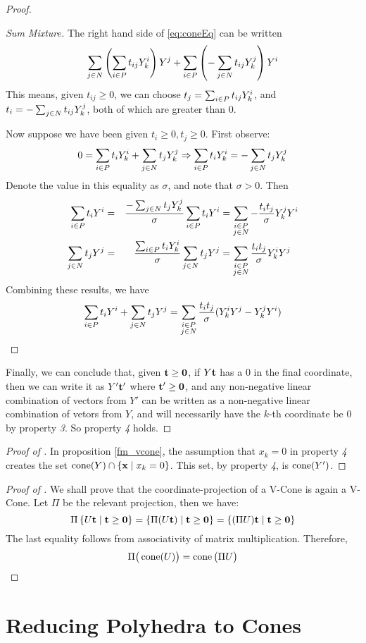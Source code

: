 \begin{proof}
\begin{proof}[Sum Mixture]
		The right hand side of \eqref{eq:coneEq} can be written
		\[ \sum_{j\in N} \left(\sum_{i\in P} t_{ij}Y^i_{k}\right) Y^j +
			\sum_{i\in P} \left(-\sum_{j\in N} t_{ij}Y^j_{k}\right) Y^i \]
		This means, given $t_{ij} \geq 0$, we can choose $t_j = \sum_{i\in P} t_{ij}Y^i_{k}$, and $t_i = -\sum_{j\in N} t_{ij}Y^j_{k}$, both of which are greater than $0$.

		Now suppose we have been given $t_i \geq 0, t_j \geq 0$.  First observe:
		\[ 0 = \sum_{i\in P} t_iY^i_{k} + \sum_{j\in N} t_jY^j_{k} \Rightarrow \sum_{i\in P} t_iY^i_{k} = -\sum_{j\in N} t_jY^j_{k}\]
		Denote the value in this equality as $\sigma$, and note that $\sigma > 0$.  Then
		\begin{alignat*}{3}
			\sum_{i\in P} t_i Y^i & = & \frac{-\sum_{j\in N} t_j Y^j_{k}}{\sigma}\sum_{i\in P} t_i Y^i & =
			\sum_{\substack{i\in P \\ j\in N}} -\frac{t_i t_j}{\sigma}Y^j_{k} Y^i                              \\
			\sum_{j\in N} t_j Y^j & = & \frac{\sum_{i\in P} t_i Y^i_{k}}{\sigma}\sum_{j\in N} t_j Y^j  & =
			\sum_{\substack{i\in P \\ j\in N}} \frac{t_i t_j}{\sigma}Y^i_{k} Y^j
		\end{alignat*}
		Combining these results, we have
		\[ \sum_{i\in P} t_i Y^i + \sum_{j\in N} t_j Y^j = \sum_{\substack{i\in P \\ j\in N}} \frac{t_i t_j}{\sigma}(Y^i_{k} Y^j - Y^j_{k} Y^i) \]
	\end{proof}
	Finally, we can conclude that, given $\mathbf{t} \geq \mathbf{0}$, if $Y\mathbf{t}$ has a $0$ in the final coordinate, then we can write it as $ Y'\mathbf{t}'$ where $\mathbf{t}' \geq \mathbf{0}$, and any non-negative linear combination of vectors from $Y'$ can be written as a non-negative linear combination of vetors from $Y$, and will necessarily have the $k$-th coordinate be $0$ by property \textit{3}.  So property \textit{4} holds.
\end{proof}

\begin{proof}[Proof of {\Hint}]
	In proposition \ref{fm_vcone}, the assumption that $x_k = 0$ in property \textit{4} creates the set $\operatorname{cone}(Y) \cap \left\{\mathbf{x} \;|\; x_k = 0\right\}$.  This set, by property \textit{4}, is $\operatorname{cone}(Y')$.
\end{proof}

\begin{proof}[Proof of {\Hproj}]
	We shall prove that the coordinate-projection of a V-Cone is again a V-Cone.  Let $\Pi$ be the relevant projection, then we have:
	\[ \Pi\left\{U\mathbf{t} \;|\; \mathbf{t} \geq \mathbf{0}\right\} = \left\{\Pi(U\mathbf{t}) \;|\; \mathbf{t} \geq \mathbf{0}\right\} =
		\left\{(\Pi U)\mathbf{t} \;|\; \mathbf{t} \geq \mathbf{0}\right\} \]
	The last equality follows from associativity of matrix multiplication.  Therefore,
	\[ \Pi\big(\operatorname{cone}(U)\big) = \operatorname{cone}\big(\Pi U\big) \]
\end{proof}

\section{Reducing Polyhedra to Cones}

